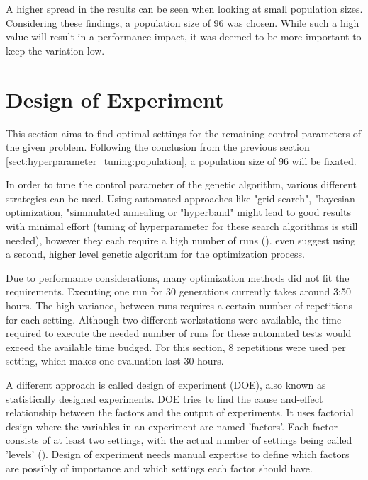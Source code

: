 A higher spread in the results can be seen when looking at small population sizes. Considering these findings, a population size of 96 was chosen. While such a high value will result in a performance impact, it was deemed to be more important to keep the variation low. 

\section{Design of Experiment}
\label{sect:hyperparameter_tuning:design_of_experiment}
This section aims to find optimal settings for the remaining control parameters of the given problem.
Following the conclusion from the previous section \ref{sect:hyperparameter_tuning:population}, a population size of 96 will be fixated. 

In order to tune the control parameter of the genetic algorithm, various different strategies can be used. Using automated approaches like "grid search", "bayesian optimization, "simmulated annealing or "hyperband" might lead to good results with minimal effort (tuning of hyperparameter for these search algorithms is still needed), however they each require a high number of runs (\cite{kacprzyk_parameter_2007}). \cite{kacprzyk_parameter_2007} even suggest using a second, higher level genetic algorithm for the optimization process.

Due to performance considerations, many optimization methods did not fit the requirements.
Executing one run for 30 generations currently takes around 3:50 hours. The high variance, between runs requires a certain number of repetitions for each setting. Although two different workstations were available, the time required to execute the needed number of runs for these automated tests would exceed the available time budged. For this section, 8 repetitions were used per setting, which makes one evaluation last 30 hours.

A different approach is called design of experiment (DOE), also known as statistically designed experiments. DOE tries to find the cause and-effect relationship between the factors and the output of experiments.
It uses factorial design where the variables in an experiment are named 'factors'. Each factor consists of at least two settings, with the actual number of settings being called 'levels' (\cite{yang_design_2009}). Design of experiment needs manual expertise to define which factors are possibly of importance and which settings each factor should have.

